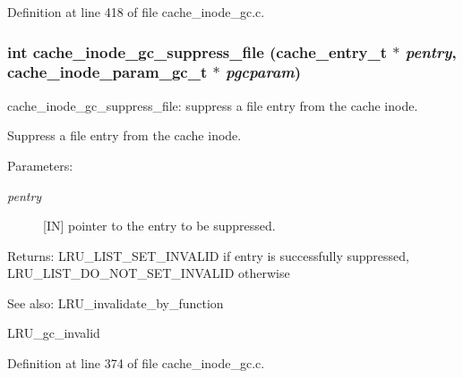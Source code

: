 Definition at line 418 of file cache\_\-inode\_\-gc.c.
\subsubsection[{cache\_\-inode\_\-gc\_\-suppress\_\-file}]{\setlength{\rightskip}{0pt plus 5cm}int cache\_\-inode\_\-gc\_\-suppress\_\-file (cache\_\-entry\_\-t $\ast$ {\em pentry}, \/  cache\_\-inode\_\-param\_\-gc\_\-t $\ast$ {\em pgcparam})}\label{group__Cache__inode__gc__internal_g135dcc8a575d9f808b57ae2a74e615b3}


cache\_\-inode\_\-gc\_\-suppress\_\-file: suppress a file entry from the cache inode.

Suppress a file entry from the cache inode.

\begin{Desc}
\item[Parameters:]
\begin{description}
\item[{\em pentry}][IN] pointer to the entry to be suppressed.\end{description}
\end{Desc}
\begin{Desc}
\item[Returns:]LRU\_\-LIST\_\-SET\_\-INVALID if entry is successfully suppressed, LRU\_\-LIST\_\-DO\_\-NOT\_\-SET\_\-INVALID otherwise\end{Desc}
\begin{Desc}
\item[See also:]LRU\_\-invalidate\_\-by\_\-function 

LRU\_\-gc\_\-invalid \end{Desc}


Definition at line 374 of file cache\_\-inode\_\-gc.c.